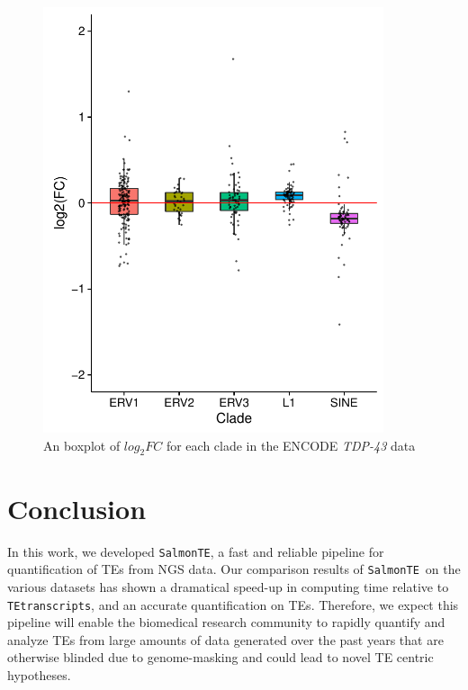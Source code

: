\documentclass[wsdraft]{ws-procs11x85}
\newcommand{\TEtranscripts}{\texttt{TEtranscripts}}
\newcommand{\SalmonTE}{\texttt{SalmonTE}}
\begin{document}
\begin{figure}[!ht]
\centerline{
\includegraphics[width=10cm]{boxplot-clade-k562}
}
\caption{An boxplot of $log_{2}FC$ for each clade in the ENCODE \textit{TDP-43} data}
\label{aba:fig5}
\end{figure}

\section{Conclusion}


In this work, we developed \SalmonTE, a fast and reliable pipeline for quantification of TEs from 
NGS data.
Our comparison results of \SalmonTE~on the various datasets has shown a dramatical speed-up in computing time relative to \TEtranscripts, 
and
an accurate quantification on TEs. 
Therefore, we expect this pipeline will enable the biomedical research community to rapidly quantify and analyze TEs from large amounts of data generated over the past years that are otherwise blinded due to genome-masking and could lead to novel TE centric hypotheses.
\end{document}
